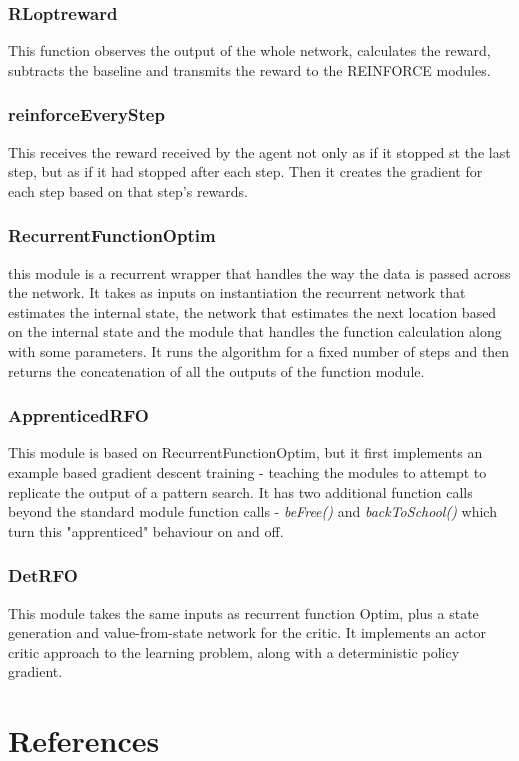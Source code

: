 \subsubsection{RLoptreward}%
This function observes the output of the whole network, calculates the reward, subtracts the baseline and transmits the reward to the REINFORCE modules.

\subsubsection{reinforceEveryStep}
This receives the reward received by the agent not only as if it stopped st the last step, but as if it had stopped after each step. Then it creates the gradient for each step based on that step's rewards.
\subsubsection{RecurrentFunctionOptim}
this module is a recurrent wrapper that handles the way the data is passed across the network. It takes as inputs on instantiation the recurrent network that estimates the internal state, the network that estimates the next location based on the internal state and the module that handles the function calculation along with some parameters. It runs the algorithm for a fixed number of steps and then returns the concatenation of all the outputs of the function module.

\subsubsection{ApprenticedRFO}
This module is based on RecurrentFunctionOptim, but it first implements an example based gradient descent training - teaching the modules to attempt to replicate the output of a pattern search. It has two additional function calls beyond the standard module function calls - \emph{beFree()} and \emph{backToSchool()} which turn this "apprenticed" behaviour on and off.

\subsubsection{DetRFO}
This module takes the same inputs as recurrent function Optim, plus a state generation and value-from-state network for the critic. It implements an actor critic approach to the learning problem, along with a deterministic policy gradient.



\section{References}
\printbibliography[omitnumbers = false]